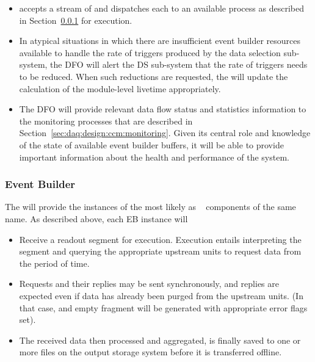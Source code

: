 \begin{itemize}
\item {} accepts a stream of  and dispatches each to an available  process as described in Section~\ref{sec:fd-daq:design-event-builder} for execution.
\item In atypical situations in which there are insufficient event builder resources available to handle the rate of triggers produced by the data selection sub-system, the DFO will alert the DS sub-system that the rate of triggers needs to be reduced.  When such reductions are requested, the  will update the calculation of the module-level  livetime appropriately.
\item The DFO will provide relevant data flow status and statistics information to the monitoring processes that are described in Section~\ref{sec:daq:design:ccm:monitoring}. Given its central role and knowledge of the state of available event builder buffers, it will be able to provide important information about the health and performance of the system.
\end{itemize}

\subsubsection{Event Builder}
\label{sec:fd-daq:design-event-builder}

The  will provide the instances of the  most likely as
~\cite{artdaq} components of the same name. 
As described above, each EB instance will

\begin{itemize}
  \item Receive a readout segment for execution. Execution entails interpreting the  segment and querying the appropriate upstream  units to request data from the period of time. 
  \item Requests and their replies may be sent synchronously, and replies are expected even if data has already been purged from the upstream  units. (In that case, and empty fragment will be generated with appropriate error flags set).
  \item The received data then processed and aggregated, is finally saved to one or more files on the output storage system before it is transferred offline.
\end{itemize}


